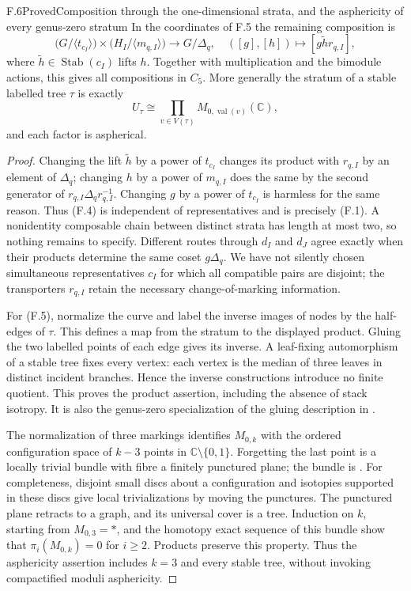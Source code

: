 \begin{statement}{F.6}{Proved}{Composition through the one-dimensional
strata, and the asphericity of every genus-zero stratum}
In the coordinates of F.5 the remaining composition is
\[
 \bigl(G/\langle t_{c_I}\rangle\bigr)
 \times\bigl(H_I/\langle m_{q,I}\rangle\bigr)
 \longrightarrow G/\Delta_q,
 \quad ([g],[h])\longmapsto[g\widetilde h r_{q,I}],              \tag{F.4}
\]
where $\widetilde h\in\operatorname{Stab}(c_I)$ lifts $h$.
Together with multiplication and the bimodule actions, this gives all
compositions in $C_5$.  More generally the stratum of a stable labelled
tree $\tau$ is exactly
\[
 U_\tau\cong\prod_{v\in V(\tau)} M_{0,\operatorname{val}(v)}(\mathbb C),
                                                               \tag{F.5}
\]
and each factor is aspherical.
\end{statement}
\begin{proof}
Changing the lift $\widetilde h$ by a power of $t_{c_I}$ changes its
product with $r_{q,I}$ by an element of $\Delta_q$; changing $h$ by a
power of $m_{q,I}$ does the same by the second generator of
$r_{q,I}\Delta_qr_{q,I}^{-1}$.  Changing $g$ by a power of
$t_{c_I}$ is harmless for the same reason.  Thus (F.4) is independent of
representatives and is precisely (F.1).  A nonidentity composable chain
between distinct strata has length at most two, so nothing remains to
specify.  Different routes through $d_I$ and $d_J$ agree exactly when
their products determine the same coset $g\Delta_q$.  We have not
silently chosen simultaneous representatives $c_I$ for which all
compatible pairs are disjoint; the transporters $r_{q,I}$ retain the
necessary change-of-marking information.

For (F.5), normalize the curve and label the inverse images of nodes by
the half-edges of $\tau$.  This defines a map from the stratum to the
displayed product.  Gluing the two labelled points of each edge gives
its inverse.  A leaf-fixing automorphism of a stable tree fixes every
vertex: each vertex is the median of three leaves in distinct incident
branches.  Hence the inverse constructions introduce no finite quotient.
This proves the product assertion, including the absence of stack
isotropy.  It is also the genus-zero specialization of the gluing
description in \citet[Catalogue, Fact 2]{FKeel1992}.

The normalization of three markings identifies $M_{0,k}$ with the
ordered configuration space of $k-3$ points in
$\mathbb C\setminus\{0,1\}$.  Forgetting the last point is a locally
trivial bundle with fibre a finitely punctured plane; the bundle is
\citet[Theorem 3]{FFadellNeuwirth1962}.  For completeness, disjoint small
discs about a configuration and isotopies supported in these discs give
local trivializations by moving the punctures.  The punctured plane
retracts to a graph, and its universal cover is a tree.  Induction on
$k$, starting from $M_{0,3}=*$, and the homotopy exact sequence of this
bundle show that $\pi_i(M_{0,k})=0$ for $i\geq2$.  Products preserve this
property.  Thus the asphericity assertion includes $k=3$ and every
stable tree, without invoking compactified moduli asphericity.
\end{proof}

